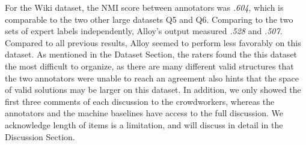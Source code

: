 

For the Wiki dataset, the NMI score between annotators was \emph{.604}, which is comparable
to the two other large datasets Q5 and Q6. Comparing to the two sets of expert
labels independently, Alloy's output measured \emph{.528} and \emph{.507}.
Compared to all previous results, Alloy seemed to perform less favorably on this
dataset. As mentioned in the Dataset Section, the raters found the this dataset the most
difficult to organize, as there are many different valid structures that the two
annotators were unable to reach an agreement 
also hints that the space of valid solutions may be larger on this dataset. 
In addition, we only showed the first three comments of
each discussion to the crowdworkers, whereas the annotators and the machine baselines
have access to the full discussion. 
We acknowledge length of items is a limitation, and will discuss in detail in
the Discussion Section.



